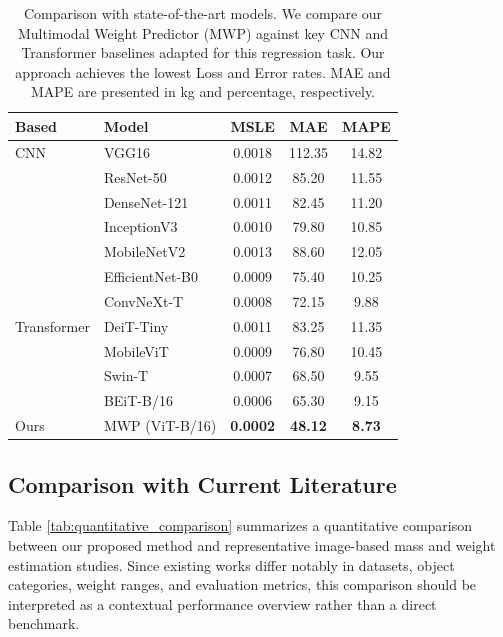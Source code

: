 \documentclass[journal,twoside,web]{ieeecolor}
\begin{document}
\begin{table}[ht!]
\centering

\caption{Comparison with state-of-the-art models. We compare our Multimodal Weight Predictor (MWP) against key CNN and Transformer baselines adapted for this regression task. Our approach achieves the lowest Loss and Error rates. MAE and MAPE are presented in kg and percentage, respectively.}
\label{tab:sota_comparison}
\renewcommand{\arraystretch}{1.2}
\scriptsize
\begin{tabular}{llccc}

\midrule
\textbf{Based} & \textbf{Model} & \textbf{MSLE} & \textbf{MAE} & \textbf{MAPE}\\
\midrule
{CNN} 
 & VGG16              & 0.0018 & 112.35 & 14.82 \\
 & ResNet-50          & 0.0012 & 85.20  & 11.55 \\
 & DenseNet-121       & 0.0011 & 82.45  & 11.20 \\
 & InceptionV3        & 0.0010 & 79.80  & 10.85 \\
 & MobileNetV2        & 0.0013 & 88.60  & 12.05 \\
 & EfficientNet-B0    & 0.0009 & 75.40  & 10.25 \\
 & ConvNeXt-T         & 0.0008 & 72.15  & 9.88  \\
{Transformer} 
 & DeiT-Tiny          & 0.0011 & 83.25  & 11.35 \\
 & MobileViT          & 0.0009 & 76.80  & 10.45 \\
 & Swin-T             & 0.0007 & 68.50  & 9.55  \\
 & BEiT-B/16          & 0.0006 & 65.30  & 9.15  \\
\midrule
Ours & MWP (ViT-B/16)  & \textbf{0.0002} & \textbf{48.12} & \textbf{8.73} \\
\midrule
\end{tabular}%
\vspace{-8pt}
\end{table}




\subsection{Comparison with Current Literature}

Table \ref{tab:quantitative_comparison} summarizes a quantitative comparison between our proposed method and representative image-based mass and weight estimation studies. Since existing works differ notably in datasets, object categories, weight ranges, and evaluation metrics, this comparison should be interpreted as a contextual performance overview rather than a direct benchmark.
\end{document}
